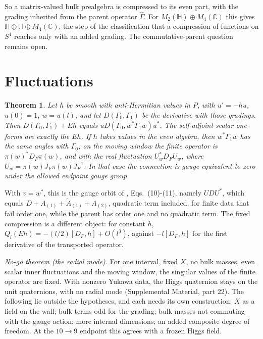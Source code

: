 \documentclass[aps,prd,reprint,onecolumn,nofootinbib,amsmath,amssymb,floatfix]{revtex4-2}
\theoremstyle{plain}
\newtheorem{theorem}{Theorem}
\newcommand{\C}{\mathbb C}
\renewcommand{\H}{\mathbb H}
\newcommand{\supp}[1]{Supplemental Material, part #1}
\begin{document}
So a matrix-valued bulk prealgebra is compressed to its even part, with the grading inherited from the parent operator $\hat\Gamma$. For $M_2(\H)\oplus M_4(\C)$ this gives $\H\oplus\H\oplus M_4(\C)$, the step of the classification \cite{CC2008} that a compression of functions on $S^4$ reaches only with an added grading. The commutative-parent question remains open.

\section{Fluctuations}

\begin{theorem}\label{thm:transport}
Let $h$ be smooth with anti-Hermitian values in $P$, with $u'=-hu$, $u(0)=1$, $w=u(l)$, and let $D(\Gamma_0,\Gamma_1)$ be the derivative with those gradings. Then $D(\Gamma_0,\Gamma_1)+Eh$ equals $uD(\Gamma_0,w^*\Gamma_1w)u^*$. The self-adjoint scalar one-forms are exactly the $Eh$. If $h$ takes values in the even algebra, then $w^*\Gamma_1w$ has the same angles with $\Gamma_0$; on the moving window the finite operator is $\pi(w)^*D_F\pi(w)$, and with the real fluctuation $U_w^*D_FU_w$, where $U_w=\pi(w)J_F\pi(w)J_F^{-1}$. In that case the connection is gauge equivalent to zero under the allowed endpoint gauge group.
\end{theorem}

With $v=w^*$, this is the gauge orbit of \cite{CCvS2013a}, Eqs.~(10)-(11), namely $UDU^*$, which equals $D+A_{(1)}+\tilde A_{(1)}+A_{(2)}$, quadratic term included, for finite data that fail order one, while the parent has order one and no quadratic term. The fixed compression is a different object: for constant $h$, $Q_l(Eh)=-(l/2)[D_F,h]+O(l^3)$, against $-l[D_F,h]$ for the first derivative of the transported operator.

\emph{No-go theorem (the radial mode).} For one interval, fixed $X$, no bulk masses, even scalar inner fluctuations and the moving window, the singular values of the finite operator are fixed. With nonzero Yukawa data, the Higgs quaternion stays on the unit quaternions, with no radial mode (\supp{22}). The following lie outside the hypotheses, and each needs its own construction: $X$ as a field on the wall; bulk terms odd for the grading; bulk masses not commuting with the gauge action; more internal dimensions; an added composite degree of freedom. At the $10\to9$ endpoint this agrees with a frozen Higgs field.
\end{document}
